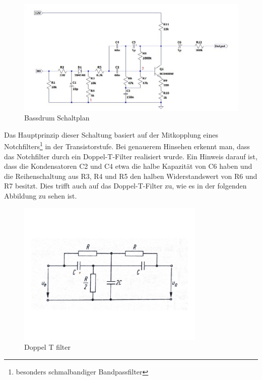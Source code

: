 \begin{figure}[h]
    \centering
    \includegraphics[width=1\textwidth]{Images/ltspice_bassdrum.jpg}
    \caption[Bassdrum Schaltplan]{Bassdrum Schaltplan}
    \label{fig:Bassdrum}
\end{figure}

Das Hauptprinzip dieser Schaltung basiert auf der Mitkopplung eines Notchfilters\footnote{besonders schmalbandiger Bandpassfilter} in der Transistorstufe. Bei genauerem Hinsehen erkennt man, dass das Notchfilter durch ein Doppel-T-Filter realisiert wurde. Ein Hinweis darauf ist, dass die Kondensatoren C2 und C4 etwa die halbe Kapazität von C6 haben und die Reihenschaltung aus R3, R4 und R5 den halben Widerstandswert von R6 und R7 besitzt. Dies trifft auch auf das Doppel-T-Filter zu, wie es in der folgenden Abbildung zu sehen ist.
\begin{figure}[H]
    \centering
    \includegraphics[width=0.8\textwidth]{Images/doppel T filter.jpg}
    \caption[Doppel T filter]{Doppel T filter \cite[s.41]{Bystron}}
    \label{fig:doppel T filter}
\end{figure}

